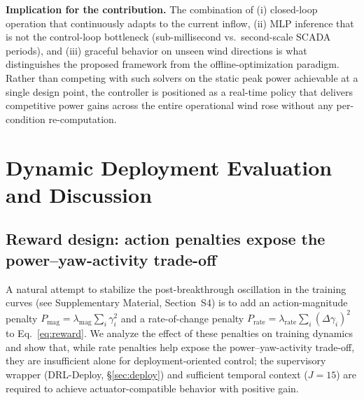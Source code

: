 \documentclass[final,5p,times]{elsarticle}
\begin{document}


\textbf{Implication for the contribution.} The combination of (i) closed-loop operation that continuously adapts to the current inflow, (ii) MLP inference that is not the control-loop bottleneck (sub-millisecond vs.\ second-scale SCADA periods), and (iii) graceful behavior on unseen wind directions is what distinguishes the proposed framework from the offline-optimization paradigm. Rather than competing with such solvers on the static peak power achievable at a single design point, the controller is positioned as a real-time policy that delivers competitive power gains across the entire operational wind rose without any per-condition re-computation.


\section{Dynamic Deployment Evaluation and Discussion}\label{sec:discussion}

\subsection{Reward design: action penalties expose the power--yaw-activity trade-off}\label{sec:reward_ablation}
A natural attempt to stabilize the post-breakthrough oscillation in
the training curves (see Supplementary Material, Section~S4) is to add an action-magnitude penalty
$P_\mathrm{mag}=\lambda_\mathrm{mag}\sum_i\gamma_i^2$ and a rate-of-change
penalty $P_\mathrm{rate}=\lambda_\mathrm{rate}\sum_i(\Delta\gamma_i)^2$
to Eq.~\eqref{eq:reward}. We analyze the effect of these penalties on
training dynamics and show that, while rate penalties help expose the
power--yaw-activity trade-off, they are insufficient alone for
deployment-oriented control; the supervisory wrapper (DRL-Deploy,
\S\ref{sec:deploy}) and sufficient temporal context ($J{=}15$) are
required to achieve actuator-compatible behavior with positive gain.
\end{document}
